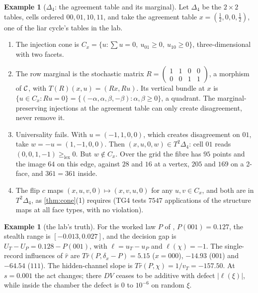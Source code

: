 \documentclass[11pt]{article}
\theoremstyle{definition}\newtheorem{definition}[theorem]{Definition}\newtheorem{remark}[theorem]{Remark}\newtheorem{example}[theorem]{Example}
\newcommand{\lex}{\ge_{\mathrm{lex}}}
\begin{document}
\begin{example}[$\Delta_4$: the agreement table and its marginal]\label{ex:delta4}
Let $\Delta_4$ be the $2\times2$ tables, cells ordered $00,01,10,11$, and take the agreement table $x=(\tfrac12,0,0,\tfrac12)$, one of the
liar cycle's tables in the lab.
\begin{enumerate}
\item The injection cone is $C_x=\{u:\sum u=0,\ u_{01}\ge0,\ u_{10}\ge0\}$, three-dimensional with two facets.
\item The row marginal is the stochastic matrix $R=\begin{pmatrix}1&1&0&0\\0&0&1&1\end{pmatrix}$, a morphism of $\mathcal C$, with $T(R)(x,u)=(Rx,Ru)$.
  Its vertical bundle at $x$ is $\{u\in C_x:Ru=0\}=\{(-\alpha,\alpha,\beta,-\beta):\alpha,\beta\ge0\}$, a quadrant. The marginal-preserving
  injections at the agreement table can only create disagreement, never remove it.
\item Universality fails. With $u=(-1,1,0,0)$, which creates disagreement on $01$, take $w=-u=(1,-1,0,0)$. Then
  $(x,u,0,w)\in T^2\Delta_4$: cell $01$ reads $(0,0,1,-1)\lex0$. But $w\notin C_x$. Over the grid the fibre has $95$ points and the image
  $64$ on this edge, against $28$ and $16$ at a vertex, $205$ and $169$ on a 2-face, and $361=361$ inside.
\item The flip $c$ maps $(x,u,v,0)\mapsto(x,v,u,0)$ for any $u,v\in C_x$, and both are in $T^2\Delta_4$, as \cref{thm:cone}(1) requires
  (TG4 tests $7547$ applications of the structure maps at all face types, with no violation).
\end{enumerate}
\end{example}

\begin{example}[the lab's truth]\label{ex:lab}
For the worked law $P$ of \cite[Section 17]{Lab}, $P(001)=0.127$, the stealth range is $[-0.013,0.027]$, and the decision gap is
$U_T-U_P=0.128-P(001)$, with $\ell=u_T-u_P$ and $\ell(\chi)=-1$. The single-record influences of $\hat r$ are $T\hat r(P,\delta_x-P)=5.15$
($x=000$), $-14.93$ ($001$) and $-64.54$ ($111$). The hidden-channel slope is $T\hat r(P,\chi)=1/v_T=-157.50$. At $s=0.001$ the act changes; there
$DV$ ceases to be additive with defect $|\ell(\xi)|$, while inside the chamber the defect is $0$ to $10^{-6}$ on random $\xi$.
\end{example}
\end{document}
